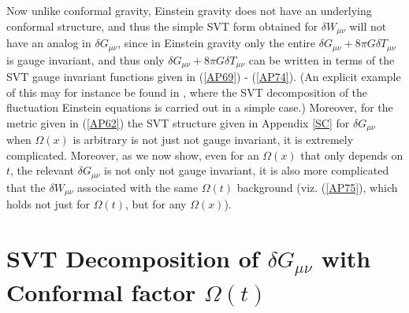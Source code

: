 \documentclass[aps]{revtex4}
\begin{document}
Now unlike conformal gravity, Einstein gravity does not have an underlying  conformal structure, and thus the simple SVT form obtained for $\delta W_{\mu\nu}$ will not have an analog in $\delta G_{\mu\nu}$, since in Einstein gravity only the entire $\delta G_{\mu\nu}+8\pi G \delta T_{\mu\nu}$ is gauge invariant, and thus only $\delta G_{\mu\nu}+8\pi G \delta T_{\mu\nu}$ can be written in terms of the SVT gauge invariant functions given in (\ref{AP69}) - (\ref{AP74}). (An explicit example of this may for instance be found in \cite{Ellis2012}, where the SVT decomposition of the fluctuation Einstein equations is carried out in a simple case.) Moreover, for the metric given in (\ref{AP62}) the SVT structure given in Appendix \ref{SC} for $\delta G_{\mu\nu}$ when $\Omega(x)$ is arbitrary is not just not gauge invariant, it is extremely complicated. Moreover, as we now show, even for an $\Omega(x)$ that only depends on $t$, the relevant $\delta G_{\mu\nu}$ is not only not gauge invariant, it is also more complicated that the $\delta W_{\mu\nu}$ associated with the same $\Omega(t)$ background (viz. (\ref{AP75}), which holds not just for $\Omega(t)$, but for any $\Omega(x)$).

\section{SVT Decomposition of  $\delta G_{\mu\nu}$ with Conformal factor $\Omega(t)$}
\label{S7}
\end{document}
